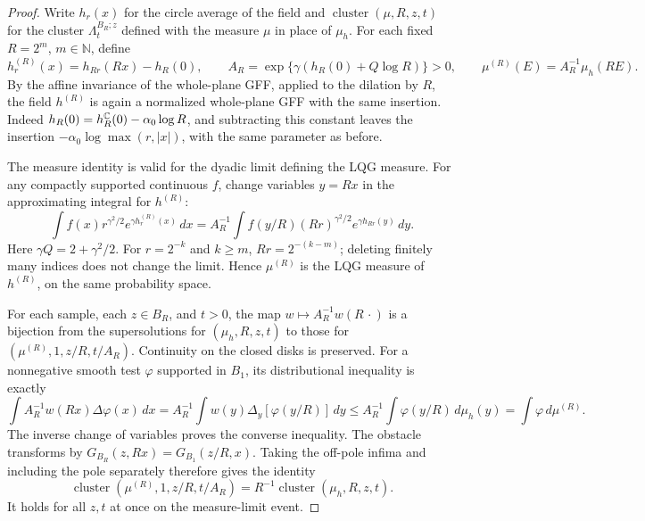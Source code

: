 \documentclass[12pt]{amsart}
\numberwithin{equation}{section}
\newcommand{\cluster}[2]{\hyperref[eq:non-co-set]{\mathit{\Lambda}^{#1}_{#2}}}
\begin{document}
	\begin{proof}
		Write $h_r(x)$ for the circle average of the field and $\operatorname{cluster}(\mu,R,z,t)$ for the cluster $\cluster{B_R;z}{t}$
		defined with the measure $\mu$ in place of $\mu_h$. For each fixed $R=2^m$, $m\in\mathbb N$, define
		\[
		 h^{(R)}_r(x)=h_{Rr}(Rx)-h_R(0),\qquad
		 A_R=\exp\{\gamma(h_R(0)+Q\log R)\}>0,\qquad
		 \mu^{(R)}(E)=A_R^{-1}\mu_h(RE).
		\]
		By the affine invariance of the whole-plane GFF, applied to the dilation by $R$, the field $h^{(R)}$ is again a normalized
		whole-plane GFF with the same insertion. Indeed $h_R(0)=h^{\mathbb{C}}_R(0)-\alpha_0\log R$, and subtracting this constant leaves the
		insertion $-\alpha_0\log\max(r,|x|)$, with the same parameter as before.

		The measure identity is valid for the dyadic limit defining the LQG measure. For any compactly supported continuous $f$,
		change variables $y=Rx$ in the approximating integral for $h^{(R)}$:
		\[
		 \int f(x)r^{\gamma^2/2}e^{\gamma h^{(R)}_r(x)}\,dx
		 =A_R^{-1}\int f(y/R)(Rr)^{\gamma^2/2}e^{\gamma h_{Rr}(y)}\,dy .
		\]
		Here $\gamma Q=2+\gamma^2/2$. For $r=2^{-k}$ and $k\geq m$, $Rr=2^{-(k-m)}$; deleting finitely many indices does not change
		the limit. Hence $\mu^{(R)}$ is the LQG measure of $h^{(R)}$, on the same probability space.

		For each sample, each $z\in B_R$, and $t>0$, the map $w\mapsto A_R^{-1}w(R\,\cdot)$ is a bijection from the supersolutions
		for $(\mu_h,R,z,t)$ to those for $(\mu^{(R)},1,z/R,t/A_R)$. Continuity on the closed disks is preserved. For a nonnegative
		smooth test $\varphi$ supported in $B_1$, its distributional inequality is exactly
		\[
		 \int A_R^{-1}w(Rx)\Delta\varphi(x)\,dx
		 =A_R^{-1}\int w(y)\Delta_y[\varphi(y/R)]\,dy
		 \leq A_R^{-1}\int\varphi(y/R)\,d\mu_h(y)
		 =\int\varphi\,d\mu^{(R)}.
		\]
		The inverse change of variables proves the converse inequality. The obstacle transforms by $G_{B_R}(z,Rx)=G_{B_1}(z/R,x)$.
		Taking the off-pole infima and including the pole separately therefore gives the identity
		\[
		 \operatorname{cluster}(\mu^{(R)},1,z/R,t/A_R)=R^{-1}\operatorname{cluster}(\mu_h,R,z,t).
		\]
		It holds for all $z,t$ at once on the measure-limit event.


\end{proof}
\end{document}
